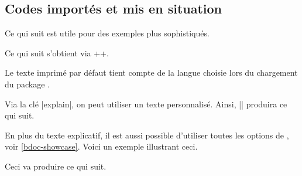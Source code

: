 \documentclass[10pt, a4paper]{article}
\begin{document}


\subsection{Codes importés et mis en situation} \label{bdoc-latexshow}

Ce qui suit est utile pour des exemples plus sophistiqués.

\begin{bdocexa}[Showcase]
    Ce qui suit s'obtient via \bdocinlatex++.

    \medskip

    \begin{bdoc-doc-showcase}
    \end{bdoc-doc-showcase}
\end{bdocexa}


\begin{bdocnote}
    Le texte imprimé par défaut tient compte de la langue choisie lors du chargement du package .
\end{bdocnote}




\begin{bdocexa}
    Via la clé \bdocinlatex|explain|, on peut utiliser un texte personnalisé. Ainsi, \bdocinlatex|| produira ce qui suit.

    \medskip

    \begin{bdoc-doc-showcase}
    \end{bdoc-doc-showcase}
\end{bdocexa}




\begin{bdocexa}
    En plus du texte explicatif, il est aussi possible d'utiliser toutes les options de , voir \ref{bdoc-showcase}.
    Voici un exemple illustrant ceci.

    \medskip


    \medskip

    Ceci va produire ce qui suit.

    \medskip

    \begin{bdoc-doc-showcase}
        
    \end{bdoc-doc-showcase}
\end{bdocexa}
\end{document}
